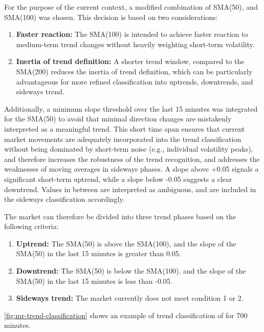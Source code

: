 For the purpose of the current context, a modified combination of SMA(50), and SMA(100) was chosen.
This decision is based on two considerations:

\begin{enumerate}
    \item \textbf{Faster reaction:} The SMA(100) is intended to achieve faster reaction to medium-term trend changes without heavily weighting short-term volatility.
    \item \textbf{Inertia of trend definition:} A shorter trend window, compared to the SMA(200) reduces the inertia of trend definition, which can be particularly advantageous for more refined classification into uptrends, downtrends, and sideways trend.
\end{enumerate}

Additionally, a minimum slope threshold over the last 15 minutes was integrated for the SMA(50) to avoid that minimal direction changes are mistakenly interpreted as a meaningful trend.
This short time span ensures that current market movements are adequately incorporated into the trend classification without being dominated by short-term noise (e.g., individual volatility peaks), and therefore increases the robustness of the trend recognition, and addresses the weaknesses of moving averages in sideways phases.
A slope above +0.05 signals a significant short-term uptrend, while a slope below -0.05 suggests a clear downtrend.
Values in between are interpreted as ambiguous, and are included in the sideways classification accordingly.

The market can therefore be divided into three trend phases based on the following criteria:

\begin{enumerate}
    \item \textbf{Uptrend:} The SMA(50) is above the SMA(100), and the slope of the SMA(50) in the last 15 minutes is greater than 0.05.
    \item \textbf{Downtrend:} The SMA(50) is below the SMA(100), and the slope of the SMA(50) in the last 15 minutes is less than -0.05.
    \item \textbf{Sideways trend:} The market currently does not meet condition 1 or 2.
\end{enumerate}

\autoref{fig:mr-trend-classification} shows an example of trend classification of \ethusdc for 700 minutes.

